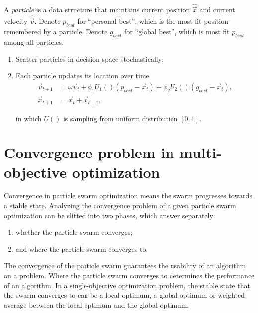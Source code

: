 \documentclass[12pt]{article}
\begin{document}
\begin{mydef}
\label{def:pso}
A \emph{particle} is a data structure that maintains current position $ \hat{\vec{x}} $ and current velocity  $ \hat{\vec{v}} $. Denote $ p_{best} $ for ``personal best'', which is the most fit position remembered by a particle. Denote $ g_{best} $ for ``global best'', which is most fit $ p_{best} $ among all particles. 
\begin{enumerate}
\item Scatter particles in decision space stochastically;
\item Each particle updates its location over time \\

\begin{subequations}
\label{eq:pso_alg}
\begin{align}
\vec{v}_{t+1} & = \omega \vec{v}_{t} + \phi_{1} U_{1}() (p_{best} - \vec{x}_{t}) + \phi_{2} U_{2}() (g_{best} - \vec{x}_{t}), \label{eq:pso_alg-1} \\
\vec{x}_{t+1} & = \vec{x}_{t} + \vec{v}_{t+1}  \label{eq:pso_alg-2},
\end{align}
\end{subequations}

in which $ U() $ is sampling from uniform distribution $ [0, 1] $.
\end{enumerate}
\end{mydef}

\section{Convergence problem in multi-objective optimization}

Convergence in particle swarm optimization means the swarm progresses towards a stable state. Analyzing the convergence problem of a given particle swarm optimization can be slitted into two phases, which answer separately:
\begin{enumerate}
\item whether the particle swarm converges;
\item and where the particle swarm converges to.
\end{enumerate}

The convergence of the particle swarm guarantees the usability of an algorithm on a problem. Where the particle swarm converges to determines the performance of an algorithm. In a single-objective optimization problem, the stable state that the swarm converges to can be a local optimum, a global optimum or weighted average between the local optimum and the global optimum.
\end{document}
